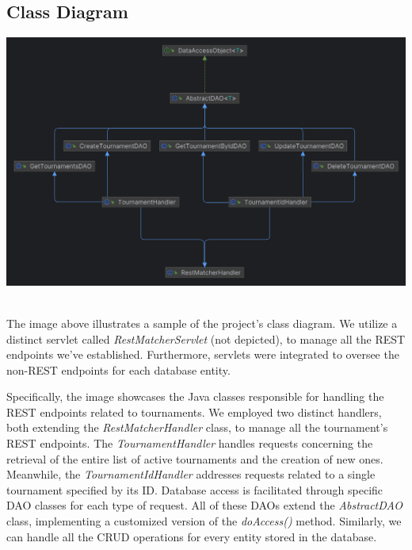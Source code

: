 \subsection{Class Diagram}

\includegraphics[width = \linewidth]{sections/BLL/ClassDiagram.png}\\\

The image above illustrates a sample of the project's class diagram. We utilize a distinct servlet called \textit{RestMatcherServlet} (not depicted), to manage all the REST endpoints we've established.
Furthermore, servlets were integrated to oversee the non-REST endpoints for each database entity.

Specifically, the image showcases the Java classes responsible for handling the REST endpoints related to tournaments. We employed two distinct handlers, both extending the \textit{RestMatcherHandler}
class, to manage all the tournament's REST endpoints. The \textit{TournamentHandler} handles requests concerning the retrieval of the entire list of active tournaments and the creation of new
ones. Meanwhile, the \textit{TournamentIdHandler} addresses requests related to a single tournament specified by its ID.
Database access is facilitated through specific DAO classes for each type of request. All of these DAOs extend the \textit{AbstractDAO} class, implementing a customized version of the
\textit{doAccess()} method. Similarly, we can handle all the CRUD operations for every entity stored in the database.

